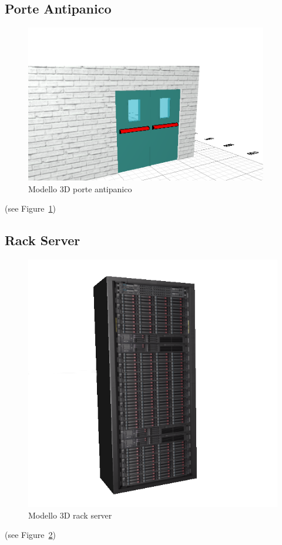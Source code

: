 \subsection*{Porte Antipanico}
\begin{figure}[htbp] %
   \centering
   \includegraphics[width=0.5\linewidth]{images/panicDoorDouble}
   \caption{Modello 3D porte antipanico}
   \label{fig:panicdoor}
   \end{figure}
   (see Figure~\ref{fig:panicdoor})
   \newpage

\subsection*{Rack Server}
\begin{figure}[htbp] %
   \centering
   \includegraphics[width=0.5\linewidth]{images/rack}
   \caption{Modello 3D rack server}
   \label{fig:rack}
   \end{figure}
   (see Figure~\ref{fig:rack})
   \newpage

